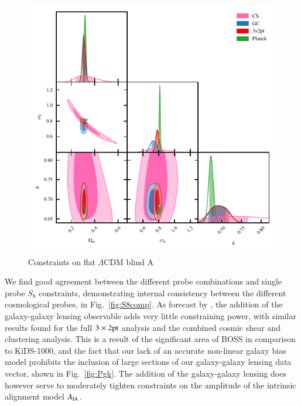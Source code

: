 \begin{figure}
	\begin{center}
		\includegraphics[width=\columnwidth]{Parameter_Plots/cosmology/omegam_sigma8_h_blind_A}
		\caption{Constraints on flat $\Lambda$CDM blind A}
		\label{fig:cosmology-params}
	\end{center}
\end{figure}

We find good agreement between the different probe combinations and single probe $S_8$ constraints, demonstrating internal consistency between the different cosmological probes, in Fig.~\ref{fig:S8comp}.  As forecast by \citet{joachimi/etal:inprep}, the addition of the galaxy-galaxy lensing observable adds very little constraining power, with similar results found for the full $3\times2{\rm pt}$ analysis and the combined cosmic shear and clustering analysis.   This is a result of the significant area of BOSS in comparison to KiDS-1000, and the fact that our lack of an accurate non-linear galaxy bias model prohibits the inclusion of large sections of our galaxy-galaxy lensing data vector, shown in Fig.~\ref{fig:Pgk}.     The addition of the galaxy-galaxy lensing does however serve to moderately tighten constraints on the amplitude of the intrinsic alignment model $A_{\rm IA}$. 

